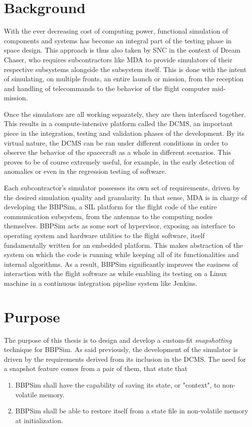 {\section{Background}
With the ever decreasing cost of computing power, functional simulation of components and systems has become an integral part of the testing phase in space design. This approach is thus also taken by \gls{SNC} in the context of Dream Chaser, who requires subcontractors like \gls{MDA} to provide simulators of their respective subsystems alongside the subsystem itself. This is done with the intent of simulating, on multiple fronts, an entire launch or mission, from the reception and handling of telecommands to the behavior of the flight computer mid-mission. 

Once the simulators are all working separately, they are then interfaced together. This results in a compute-intensive platform called the \gls{DCMS}, an important piece in the integration, testing and validation phases of the development. By its virtual nature, the \gls{DCMS} can be ran under different conditions in order to observe the behavior of the spacecraft as a whole in different scenarios. This proves to be of course extremely useful, for example, in the early detection of anomalies or even in the regression testing of software.

Each subcontractor's simulator possesses its own set of requirements, driven by the desired simulation quality and granularity. In that sense, \gls{MDA} is in charge of developing the \gls{BBPSim}, a \gls{SIL} platform for the flight code of the entire communication subsystem, from the antennas to the computing nodes themselves. \gls{BBPSim} acts as some sort of hypervisor, exposing an interface to operating system and hardware utilities to the flight software, itself fundamentally written for an embedded platform. This makes abstraction of the system on which the code is running while keeping all of its functionalities and internal algorithms. As a result, \gls{BBPSim} significantly improves the easiness of interaction with the flight software as while enabling its testing on a Linux machine in a continuous integration pipeline system like Jenkins.

\section{Purpose}
The purpose of this thesis is to design and develop a custom-fit \textit{snapshotting} technique for \gls{BBPSim}. As said previously, the development of the simulator is driven by the requirements derived from its inclusion in the DCMS. The need for a snapshot feature comes from a pair of them, that state that
\begin{enumerate}
	\item \gls{BBPSim} shall have the capability of saving its state, or "context", to non-volatile memory.
	\item \gls{BBPSim} shall be able to restore itself from a state file in non-volatile memory at initialization.
\end{enumerate} 

}
